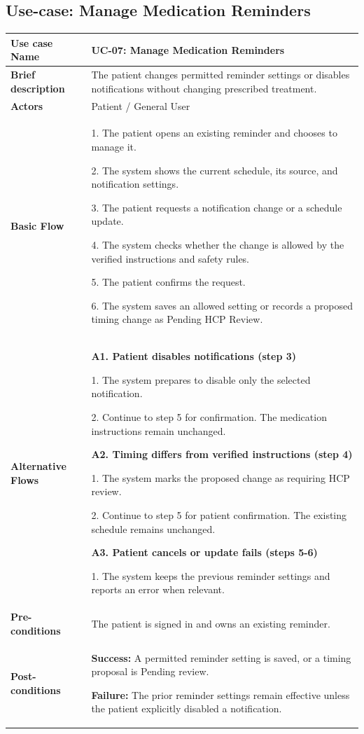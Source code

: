 \subsection{Use-case: Manage Medication Reminders}
\label{uc:uc-07}
\begin{longtable}{|p{}|p{}|}
\hline
\textbf{Use case Name} & UC-07: Manage Medication Reminders \\ \hline
\textbf{Brief description} & The patient changes permitted reminder settings or disables notifications without changing prescribed treatment. \\ \hline
\textbf{Actors} & Patient / General User \\ \hline
\textbf{Basic Flow} &
1. The patient opens an existing reminder and chooses to manage it.\par
2. The system shows the current schedule, its source, and notification settings.\par
3. The patient requests a notification change or a schedule update.\par
4. The system checks whether the change is allowed by the verified instructions and safety rules.\par
5. The patient confirms the request.\par
6. The system saves an allowed setting or records a proposed timing change as Pending HCP Review.
\\ \hline
\textbf{Alternative Flows} &
\textbf{A1. Patient disables notifications (step 3)}\par
1. The system prepares to disable
only the selected notification.\par
2. Continue to step 5 for confirmation.
The medication instructions remain unchanged.
\par\smallskip

\textbf{A2. Timing differs from verified
instructions (step 4)}\par
1. The system marks the proposed
change as requiring HCP review.\par
2. Continue to step 5 for patient
confirmation. The existing schedule
remains unchanged.

\par\smallskip
\textbf{A3. Patient cancels or update fails (steps 5-6)}\par
1. The system keeps the previous reminder settings and reports an error when relevant.
\\ \hline
\textbf{Pre-conditions} & The patient is signed in and owns an existing reminder. \\ \hline
\textbf{Post-conditions} & \textbf{Success:} A permitted reminder setting is saved, or a timing proposal is Pending review.\par
\textbf{Failure:} The prior reminder settings remain effective unless the patient explicitly disabled a notification. \\ \hline
\end{longtable}

